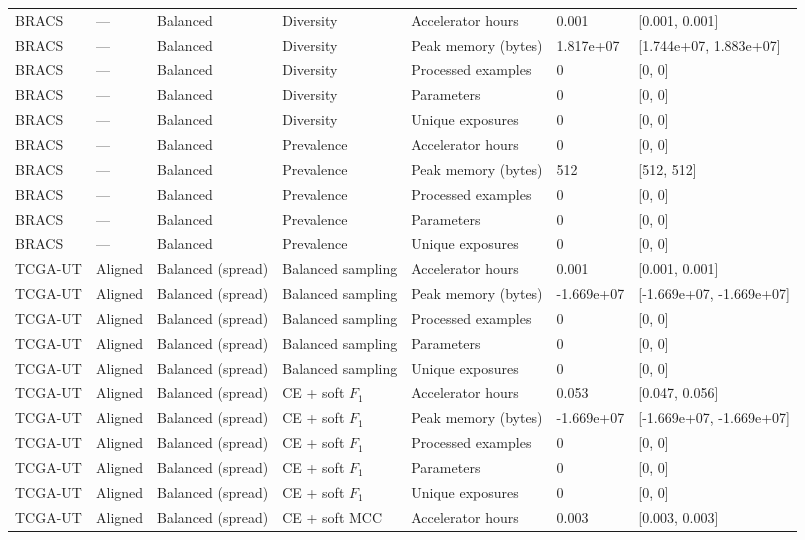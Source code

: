 \begin{longtable}{lllllll}
BRACS & --- & Balanced & Diversity & Accelerator hours & 0.001 & [0.001, 0.001] \\
BRACS & --- & Balanced & Diversity & Peak memory (bytes) & 1.817e+07 & [1.744e+07, 1.883e+07] \\
BRACS & --- & Balanced & Diversity & Processed examples & 0 & [0, 0] \\
BRACS & --- & Balanced & Diversity & Parameters & 0 & [0, 0] \\
BRACS & --- & Balanced & Diversity & Unique exposures & 0 & [0, 0] \\
BRACS & --- & Balanced & Prevalence & Accelerator hours & 0 & [0, 0] \\
BRACS & --- & Balanced & Prevalence & Peak memory (bytes) & 512 & [512, 512] \\
BRACS & --- & Balanced & Prevalence & Processed examples & 0 & [0, 0] \\
BRACS & --- & Balanced & Prevalence & Parameters & 0 & [0, 0] \\
BRACS & --- & Balanced & Prevalence & Unique exposures & 0 & [0, 0] \\
TCGA-UT & Aligned & Balanced (spread) & Balanced sampling & Accelerator hours & 0.001 & [0.001, 0.001] \\
TCGA-UT & Aligned & Balanced (spread) & Balanced sampling & Peak memory (bytes) & -1.669e+07 & [-1.669e+07, -1.669e+07] \\
TCGA-UT & Aligned & Balanced (spread) & Balanced sampling & Processed examples & 0 & [0, 0] \\
TCGA-UT & Aligned & Balanced (spread) & Balanced sampling & Parameters & 0 & [0, 0] \\
TCGA-UT & Aligned & Balanced (spread) & Balanced sampling & Unique exposures & 0 & [0, 0] \\
TCGA-UT & Aligned & Balanced (spread) & CE + soft $F_1$ & Accelerator hours & 0.053 & [0.047, 0.056] \\
TCGA-UT & Aligned & Balanced (spread) & CE + soft $F_1$ & Peak memory (bytes) & -1.669e+07 & [-1.669e+07, -1.669e+07] \\
TCGA-UT & Aligned & Balanced (spread) & CE + soft $F_1$ & Processed examples & 0 & [0, 0] \\
TCGA-UT & Aligned & Balanced (spread) & CE + soft $F_1$ & Parameters & 0 & [0, 0] \\
TCGA-UT & Aligned & Balanced (spread) & CE + soft $F_1$ & Unique exposures & 0 & [0, 0] \\
TCGA-UT & Aligned & Balanced (spread) & CE + soft MCC & Accelerator hours & 0.003 & [0.003, 0.003] \\

\end{longtable}
